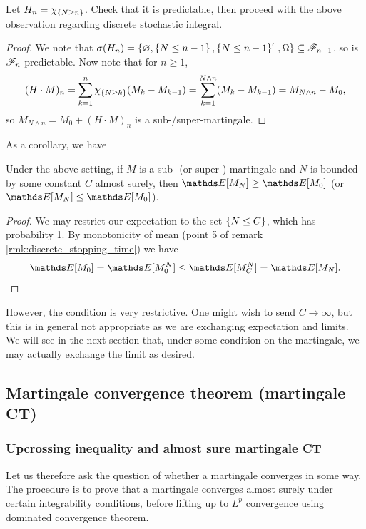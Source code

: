 \begin{hint}
Let $H_n = \chi_{\left\{ N \geq n \right \}}$. Check that it is predictable, then proceed with the above observation regarding discrete stochastic integral.
\end{hint}

\begin{proof}
We note that $\sigma(H_n) = \left\{ \varnothing, \left\{ N \leq n-1 \right \}, \left\{ N \leq n-1 \right \}^c, \Omega \right \} \subseteq \mathcal{F}_{n-1}$, so is $\mathcal{F}_n$ predictable. Now note that for $n\geq 1$, 
\begin{align*}
    (H \cdot M)_n = \sum_{k=1}^n \chi_{\left\{ N \geq k \right \}} (M_k - M_{k-1}) = \sum_{k=1}^{N \wedge n} (M_k - M_{k-1}) = M_{N \wedge n} - M_0,
\end{align*}
so $M_{N \wedge n} = M_0 + (H \cdot M)_n$ is a sub-/super-martingale.
\end{proof}

As a corollary, we have
\begin{corollary}
Under the above setting, if $M$ is a sub- (or super-) martingale and $N$ is bounded by some constant $C$ almost surely, then $\E[M_N] \geq \E[M_0]$ (or $\E[M_N] \leq \E[M_0]$). 
\end{corollary}

\begin{proof}
We may restrict our expectation to the set $\left\{ N \leq C \right \}$, which has probability 1. By monotonicity of mean (point 5 of remark \ref{rmk:discrete_stopping_time}) we have
\begin{equation*}
    \E[M_0] = \E[M_0^N] \leq \E[M_C^N] = \E[M_N].
\end{equation*}
\end{proof}

However, the condition is very restrictive. One might wish to send $C \to \infty$, but this is in general not appropriate as we are exchanging expectation and limits. We will see in the next section that, under some condition on the martingale, we may actually exchange the limit as desired.

\subsection{Martingale convergence theorem (martingale CT)}

\subsubsection{Upcrossing inequality and almost sure martingale CT}
Let us therefore ask the question of whether a martingale converges in some way. The procedure is to prove that a martingale converges almost surely under certain integrability conditions, before lifting up to $L^p$ convergence using dominated convergence theorem.

